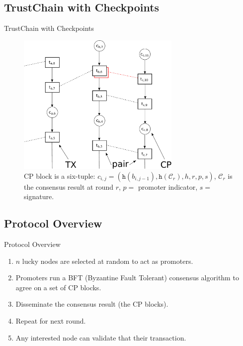 \documentclass{beamer}
\begin{document}
\subsection{TrustChain with Checkpoints}
\begin{frame}{TrustChain with Checkpoints}

  \begin{figure}[h]
  \includegraphics[width=0.7\textwidth]{figures/trustchain-bad-cp}
  \centering
  \caption{CP block is a six-tuple: $c_{i,j} = (\texttt{h}(b_{i,j-1}),
    \texttt{h}(\mathcal{C}_r), h, r, p, s)$, $\mathcal{C}_r$ is the consensus
    result at round $r$, $p =$ promoter indicator, $s =$ signature.}
  \end{figure}

\end{frame}

\subsection{Protocol Overview}
\begin{frame}{Protocol Overview}
  \begin{enumerate}
    \item $n$ lucky nodes are selected at random to act as promoters.
    \item Promoters run a BFT (Byzantine Fault Tolerant) consensus algorithm to
      agree on a set of CP blocks.
    \item Disseminate the consensus result (the CP blocks).
    \item Repeat for next round.
    \item Any interested node can validate that their transaction.
  \end{enumerate}
\end{frame}
\end{document}
